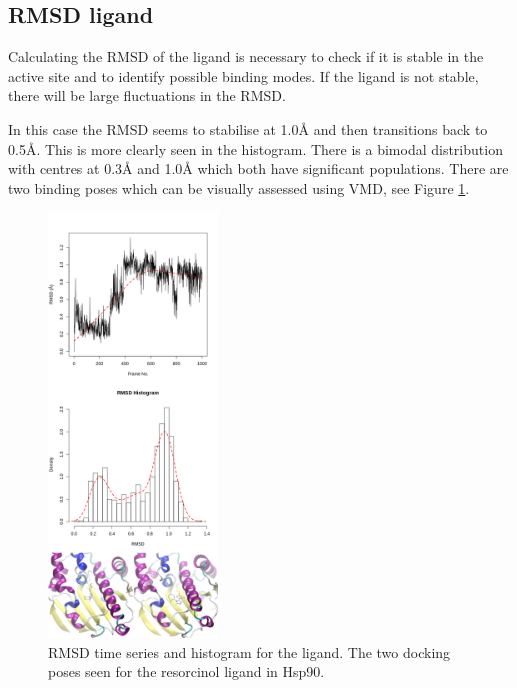 \documentclass[twocolumn]{bmcart}%
\begin{document}
\subsection*{RMSD ligand}
Calculating the RMSD of the ligand is necessary to check if it is stable in the active site and to identify possible binding modes. If the ligand is not stable, there will be large fluctuations in the RMSD.

In this case the RMSD seems to stabilise at 1.0{\AA} and then transitions back to 0.5{\AA}. This is more clearly seen in the histogram. There is a bimodal distribution with centres at 0.3{\AA} and 1.0{\AA} which both have significant populations. There are two binding poses which can be visually assessed using VMD\cite{hump_vmd_1996}, see Figure \ref{fig:rmsdligand}.

\begin{figure}[h!]
  \includegraphics[width=0.4\textwidth]{htmd_analysis_rmsd2_with_binding_merge}
  \caption{
      RMSD time series and histogram for the ligand. The two docking poses seen for the resorcinol ligand in Hsp90.}
  \label{fig:rmsdligand}
\end{figure}
\end{document}
